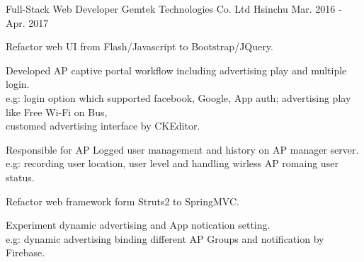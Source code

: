 \begin{cventries}
  \cventry
    {Full-Stack Web Developer} %
    {Gemtek Technologies Co. Ltd} %
    {Hsinchu} %
    {Mar. 2016 - Apr. 2017} %
    {
      \begin{cvitems} %
        \item {Refactor web UI from Flash/Javascript to Bootstrap/JQuery.}
        \item {Developed AP captive portal workflow including advertising play and multiple login. \\
              e.g: login option which supported facebook, Google, App auth; advertising play like Free Wi-Fi on Bus, \\
              customed advertising interface by CKEditor.}
        \item {Responsible for AP Logged user management and history on AP manager server.\\
              e.g: recording user location, user level and handling wirless AP romaing user status.}
        \item {Refactor web framework form Struts2 to SpringMVC.}
        \item {Experiment dynamic advertising and App notication setting.\\
              e.g: dynamic advertising binding different AP Groups and notification by Firebase.}
      \end{cvitems}
    }

\end{cventries}
